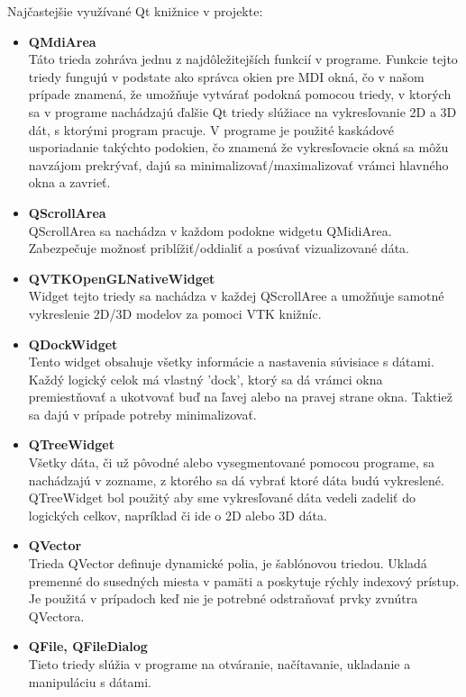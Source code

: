 \documentclass[a4paper,12pt,twoside]{article}%
\begin{document}
Najčastejšie využívané Qt knižnice v projekte:
\begin{itemize}
\item \textbf{QMdiArea}\\ 
Táto trieda zohráva jednu z najdôležitejších funkcií v programe. Funkcie tejto triedy fungujú v podstate ako správca okien pre MDI okná, čo v našom prípade znamená, že umožňuje vytvárať podokná pomocou triedy, v ktorých sa v programe nachádzajú ďalšie Qt triedy slúžiace na vykresľovanie 2D a 3D dát, s ktorými program pracuje. V programe je použité kaskádové usporiadanie takýchto podokien, čo znamená že vykresľovacie okná sa môžu navzájom prekrývať, dajú sa minimalizovať/maximalizovať vrámci hlavného okna a zavrieť.

\item \textbf{QScrollArea} \\
QScrollArea sa nachádza v každom podokne widgetu QMidiArea. Zabezpečuje možnosť priblížiť/oddialiť a posúvať vizualizované dáta.  

\item \textbf{QVTKOpenGLNativeWidget} \\
Widget tejto triedy sa nachádza v každej QScrollAree a umožňuje samotné vykreslenie 2D/3D modelov za pomoci VTK knižníc. 

\item \textbf{QDockWidget} \\
Tento widget obsahuje všetky informácie a nastavenia súvisiace s dátami. Každý logický celok má vlastný 'dock', ktorý sa dá vrámci okna premiestňovať a ukotvovať buď na ľavej alebo na pravej strane okna. Taktiež sa dajú v prípade potreby minimalizovať.

\item \textbf{QTreeWidget} \\ 
Všetky dáta, či už pôvodné alebo vysegmentované pomocou programe, sa nachádzajú v zozname, z ktorého sa dá vybrať ktoré dáta budú vykreslené. QTreeWidget bol použitý aby sme vykresľované dáta vedeli zadeliť do logických celkov, napríklad či ide o 2D alebo 3D dáta.

\item \textbf{QVector} \\
Trieda QVector definuje dynamické polia, je šablónovou triedou.
Ukladá premenné do susedných miesta v pamäti a poskytuje rýchly indexový prístup. Je použitá v prípadoch keď nie je potrebné odstraňovať prvky zvnútra QVectora.

\item \textbf{QFile, QFileDialog} \\
Tieto triedy slúžia v programe na otváranie, načítavanie, ukladanie a manipuláciu s dátami.

\end{itemize}
\end{document}
